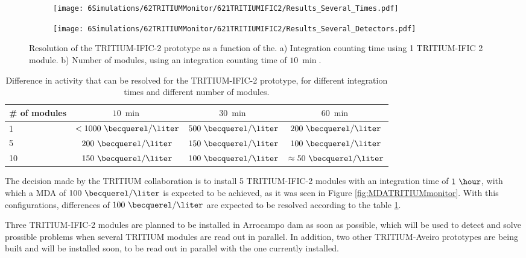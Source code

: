 \begin{figure}
\centering
    \begin{subfigure}[b]{0.75\textwidth}
    \centering
    \texttt{[image: 6Simulations/62TRITIUMMonitor/621TRITIUMIFIC2/Results\_Several\_Times.pdf]}  
    \caption{\label{subfig:ResolutionvsIntegrationCoutingTime}}
    \end{subfigure}
    \hfill
    \begin{subfigure}[b]{0.75\textwidth}
    \centering
    \texttt{[image: 6Simulations/62TRITIUMMonitor/621TRITIUMIFIC2/Results\_Several\_Detectors.pdf]}  
    \caption{\label{subfig:ResolutionvsNumberDetectors}}
    \end{subfigure}
 \caption{Resolution of the TRITIUM-IFIC-2 prototype as a function of the. a) Integration counting time using 1 TRITIUM-IFIC 2 module. b) Number of modules, using an integration counting time of $10~\min$.}
 \label{fig:Resolution}
\end{figure}

\begin{table}[htbp]
\centering{}%
\begin{tabular}{lccc}
\toprule 
\# of modules & $10~\min$ & $30~\min$ & $60~\min$ \tabularnewline
\midrule
\midrule 
1 & $<1000~\becquerel/\liter$ & $500~\becquerel/\liter$ & $200~\becquerel/\liter$ \tabularnewline
5 & $200~\becquerel/\liter$ & $150~\becquerel/\liter$ & $100~\becquerel/\liter$ \tabularnewline
10 & $150~\becquerel/\liter$ & $100~\becquerel/\liter$ & $\approx 50~\becquerel/\liter$ \tabularnewline
\bottomrule
\end{tabular}
\caption{Difference in activity that can be resolved for the TRITIUM-IFIC-2 prototype, for different integration times and different number of modules.}
\label{tab:DifferentCasesOfTI2}
\end{table}

The decision made by the TRITIUM collaboration is to install 5 TRITIUM-IFIC-2 modules with an integration time of $1~\hour$, with which a MDA of $100~\becquerel/\liter$ is expected to be achieved, as it was seen in Figure \ref{fig:MDATRITIUMmonitor}. With this configurations, differences of $100~\becquerel/\liter$ are expected to be resolved according to the table \ref{tab:DifferentCasesOfTI2}. 

Three TRITIUM-IFIC-2 modules are planned to be installed in Arrocampo dam as soon as possible, which will be used to detect and solve prossible problems when several TRITIUM modules are read out in parallel. In addition, two other TRITIUM-Aveiro prototypes are being built and will be installed soon, to be read out in parallel with the one currently installed.

